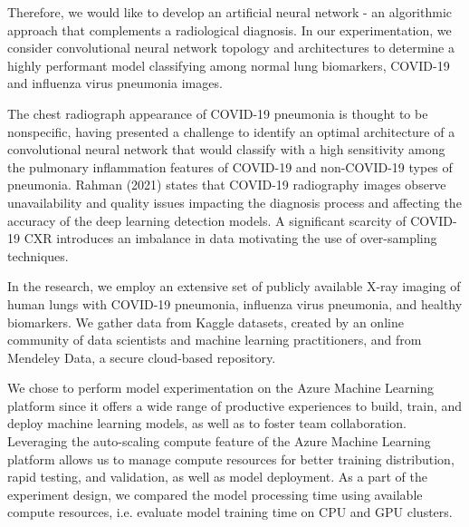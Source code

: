 \documentclass[12pt, twocolumn]{CUP-JNL-PPS}
\begin{document}
Therefore, we would like to develop an artificial neural network - an
algorithmic approach that complements a radiological diagnosis. In our experimentation, we consider convolutional neural network topology and architectures to
determine a highly performant model classifying among normal lung biomarkers,
COVID-19 and influenza virus pneumonia images.

The chest radiograph appearance of COVID-19 pneumonia is thought
to be nonspecific, having presented a challenge to identify an optimal architecture
of a convolutional neural network that would classify with a high sensitivity among
the pulmonary inflammation features of COVID-19 and non-COVID-19 types of
pneumonia. Rahman (2021) states that COVID-19 radiography images observe
unavailability and quality issues impacting the diagnosis process and affecting the
accuracy of the deep learning detection models. A significant scarcity of COVID-19 CXR introduces an imbalance in data motivating the use of over-sampling
techniques.

In the research, we employ an extensive set of publicly available X-ray
imaging of human lungs with COVID-19 pneumonia, influenza virus pneumonia,
and healthy biomarkers. We gather data from Kaggle datasets, created by an
online community of data scientists and machine learning practitioners, and from
Mendeley Data, a secure cloud-based repository.

We chose to perform model experimentation on the Azure Machine
Learning platform since it offers a wide range of productive experiences to build,
train, and deploy machine learning models, as well as to foster team collaboration. Leveraging the auto-scaling compute feature of the Azure Machine Learning
platform allows us to manage compute resources for better training distribution,
rapid testing, and validation, as well as model deployment. As a part of the experiment design, we compared the model processing time using available compute
resources, i.e. evaluate model training time on CPU and GPU clusters.
\end{document}
